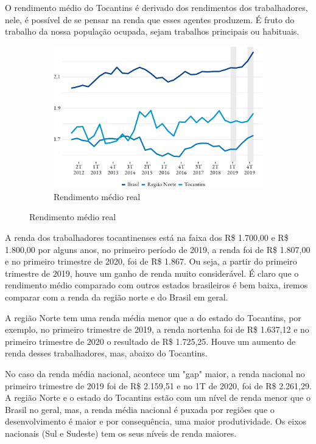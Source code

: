 \par O rendimento médio do Tocantins é derivado dos rendimentos dos trabalhadores, nele, é possível de se pensar na renda que esses agentes produzem. É fruto do trabalho da nossa população ocupada, sejam trabalhos principais ou habituais. 

\begin{figure}[!h]
	\begin{subfigure}{\linewidth}
		\caption{Rendimento médio real}
		\includegraphics{fig/rend_medio-1.pdf}
	\end{subfigure}
\end{figure}


\par A renda dos trabalhadores tocantinenses está na faixa dos R\$ 1.700,00 e R\$ 1.800,00 por alguns anos, no primeiro período de 2019, a renda foi de R\$ 1.807,00 e no primeiro trimestre de 2020, foi de R\$ 1.867. Ou seja, a partir do primeiro trimestre de 2019, houve um ganho de renda muito considerável. É claro que o rendimento médio comparado com outros estados brasileiros é bem baixa, iremos comparar com a renda da região norte e do Brasil em geral.


\par A região Norte tem uma renda média menor que a do estado do Tocantins, por exemplo, no primeiro trimestre de 2019, a renda nortenha foi de R\$ 1.637,12 e no primeiro trimestre de 2020 o resultado de R\$ 1.725,25. Houve um aumento de renda desses trabalhadores, mas, abaixo do Tocantins.



\par No caso da renda média nacional, acontece um "gap" maior, a renda nacional no primeiro trimestre de 2019 foi de R\$ 2.159,51 e no 1T de 2020, foi de R\$ 2.261,29. A região Norte e o estado do Tocantins estão com um nível de renda menor que o Brasil no geral, mas, a renda média nacional é puxada por regiões que o desenvolvimento é maior e por consequência, uma maior produtividade. Os eixos nacionais (Sul e Sudeste) tem os seus níveis de renda maiores.
